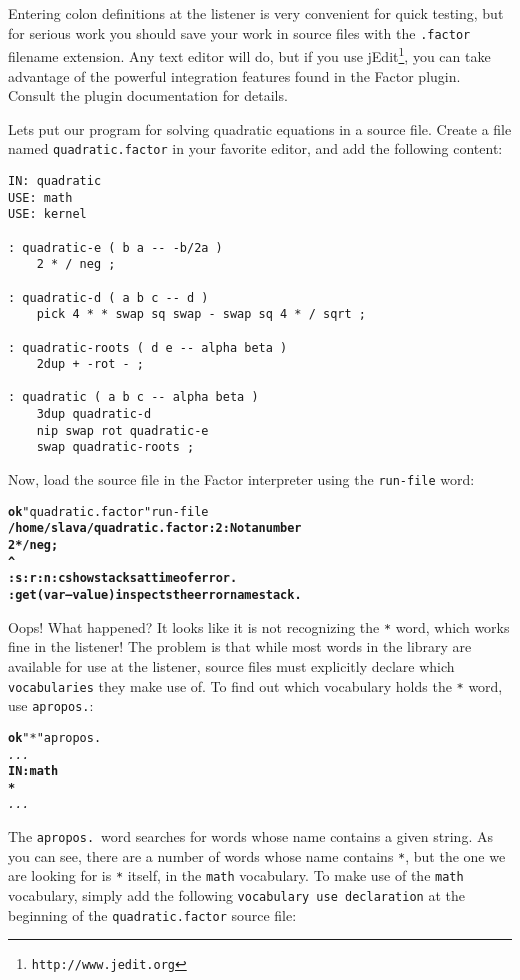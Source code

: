 \documentclass[english]{book}
\begin{document}
Entering colon definitions at the listener is very convenient for quick testing, but for serious work you should save your work in source files with the \texttt{.factor} filename extension. Any text editor will do, but if you use jEdit\footnote{\texttt{http://www.jedit.org}}, you can take advantage of the powerful integration features found in the Factor plugin. Consult the plugin documentation for details.

Lets put our program for solving quadratic equations in a source file. Create a file named \texttt{quadratic.factor} in your favorite editor, and add the following content:

\begin{verbatim}
IN: quadratic
USE: math
USE: kernel

: quadratic-e ( b a -- -b/2a )
    2 * / neg ;

: quadratic-d ( a b c -- d )
    pick 4 * * swap sq swap - swap sq 4 * / sqrt ;

: quadratic-roots ( d e -- alpha beta )
    2dup + -rot - ;

: quadratic ( a b c -- alpha beta )
    3dup quadratic-d
    nip swap rot quadratic-e
    swap quadratic-roots ;
\end{verbatim}

Now, load the source file in the Factor interpreter using the \texttt{run-file} word:

\begin{alltt}
\textbf{ok} "quadratic.factor" run-file
\textbf{/home/slava/quadratic.factor:2: Not a number
    2 * / neg ;
       ^
:s :r :n :c show stacks at time of error.
:get ( var -- value ) inspects the error namestack.}
\end{alltt}

Oops! What happened? It looks like it is not recognizing the \texttt{*} word, which works fine in the listener! The problem is that while most words in the library are available for use at the listener, source files must explicitly declare which \texttt{vocabularies} they make use of. To find out which vocabulary holds the \texttt{*} word, use \texttt{apropos.}:

\begin{alltt}
\textbf{ok} "*" apropos.
\emph{...}
\textbf{IN: math
*}
\emph{...}
\end{alltt}

The \texttt{apropos.}~word searches for words whose name contains a given string. As you can see, there are a number of words whose name contains \texttt{*}, but the one we are looking for is \texttt{*} itself, in the \texttt{math} vocabulary. To make use of the \texttt{math} vocabulary, simply add the following \texttt{vocabulary use declaration} at the beginning of the \texttt{quadratic.factor} source file:
\end{document}
